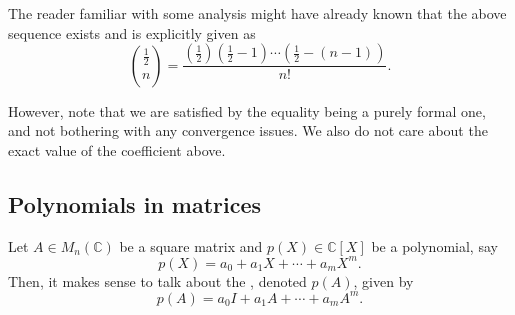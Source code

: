\documentclass[12pt]{article}
\begin{document}
\begin{rem}
	The reader familiar with some analysis might have already known that the above sequence exists and is explicitly given as
	\begin{equation*} 
		\binom{\frac{1}{2}}{n} = \frac{\left(\frac{1}{2}\right)\left(\frac{1}{2} - 1\right) \cdots \left(\frac{1}{2} - (n - 1)\right)}{n!}.
	\end{equation*}

	However, note that we are satisfied by the equality being a purely formal one, and not bothering with any convergence issues. We also do not care about the exact value of the coefficient above.
\end{rem}




\subsection{Polynomials in matrices}

Let $A \in M_{n}(\mathbb{C})$ be a square matrix and $p(X) \in \mathbb{C}[X]$ be a polynomial, say
\begin{equation*} 
	p(X) = a_{0} + a_{1} X + \cdots + a_{m} X^{m}.
\end{equation*}
Then, it makes sense to talk about the , denoted $p(A)$, given by
\begin{equation*} 
	p(A) = a_{0} I + a_{1} A + \cdots + a_{m} A^{m}.
\end{equation*}
\end{document}

